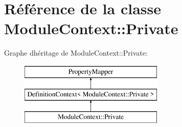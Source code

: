 \hypertarget{class_module_context_1_1_private}{}\section{Référence de la classe Module\+Context\+:\+:Private}
\label{class_module_context_1_1_private}
Graphe d\textquotesingle{}héritage de Module\+Context\+:\+:Private\+:\begin{figure}[H]
\begin{center}
\leavevmode
\includegraphics[height=3.000000cm]{class_module_context_1_1_private}
\end{center}
\end{figure}
